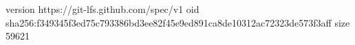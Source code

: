 version https://git-lfs.github.com/spec/v1
oid sha256:f349345f3ed75c793386bd3ee82f45e9ed891ca8de10312ac72323de573f3aff
size 59621
